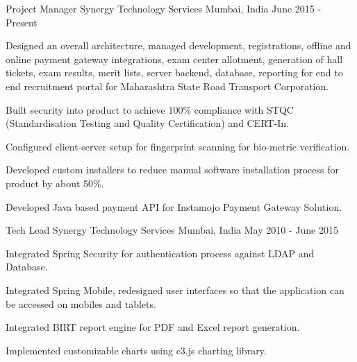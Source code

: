 

\begin{cventries}

  \cventry
    {Project Manager} %
    {Synergy Technology Services} %
    {Mumbai, India} %
    {June 2015 - Present} %
    {
      \begin{cvitems} %
        \item {Designed an overall architecture, managed development, registrations, offline and online payment gateway integrations, exam center allotment, generation of hall tickets, exam results, merit lists, server backend, database, reporting for end to end recruitment portal for Maharashtra State Road Transport Corporation.}
        \item {Built security into product to achieve 100\% compliance with STQC (Standardisation Testing and Quality Certification) and CERT-In.}
        \item {Configured client-server setup for fingerprint scanning for bio-metric verification.}
        \item {Developed custom installers to reduce manual software installation process for product by about 50\%.}
        \item {Developed Java based payment API for Instamojo Payment Gateway Solution.}
      \end{cvitems}
    }

  \cventry
    {Tech Lead} %
    {Synergy Technology Services} %
    {Mumbai, India} %
    {May 2010 - June 2015} %
    {
      \begin{cvitems} %
        \item {Integrated Spring Security for authentication process against LDAP and Database.}
        \item {Integrated Spring Mobile, redesigned user interfaces so that the application can be accessed on mobiles and tablets.}
        \item {Integrated BIRT report engine for PDF and Excel report generation. }
        \item {Implemented customizable charts using c3.js charting library.}
      \end{cvitems}
    }


\end{cventries}
